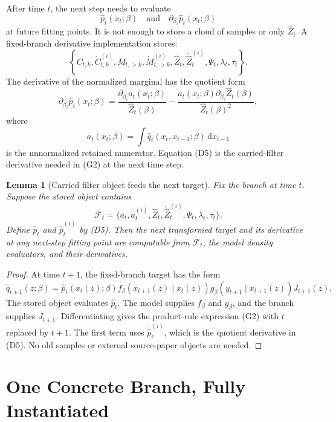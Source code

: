 \documentclass[11pt]{article}
\newtheorem{lemma}{Lemma}
\newcommand{\dd}{\,\mathrm d}
\begin{document}
After time \(t\), the next step needs to evaluate
\[
    \widehat p_t(x_t;\beta)
    \quad\text{and}\quad
    \partial_{\beta_i}\widehat p_t(x_t;\beta)
\]
at future fitting points.  It is not enough to store a cloud of samples or only
\(\widehat Z_t\).  A fixed-branch derivative implementation stores:
\[
    \left\{
    C_{t,k},\dot C_{t,k}^{(i)},M_{t,>k},\dot M_{t,>k}^{(i)},
    \widehat Z_t,\dot{\widehat Z}_t^{(i)},
    \Psi_t,\lambda_t,\tau_t
    \right\}.
    \tag{D4}
\]
The derivative of the normalized marginal has the quotient form
\[
    \partial_{\beta_i}\widehat p_t(x_t;\beta)
    =
    \frac{\partial_{\beta_i}a_t(x_t;\beta)}{\widehat Z_t(\beta)}
    -
    \frac{a_t(x_t;\beta)\partial_{\beta_i}\widehat Z_t(\beta)}
    {\widehat Z_t(\beta)^2},
    \tag{D5}
\]
where
\[
    a_t(x_t;\beta)
    =
    \int \widehat q_t(x_t,x_{t-1};\beta)\dd x_{t-1}
    \tag{D6}
\]
is the unnormalized retained numerator.  Equation (D5) is the carried-filter
derivative needed in (G2) at the next time step.

\begin{lemma}[Carried filter object feeds the next target]
Fix the branch at time \(t\).  Suppose the stored object contains
\[
    \mathcal F_t
    =
    \{a_t,\dot a_t^{(i)},\widehat Z_t,\dot{\widehat Z}_t^{(i)},
      \Psi_t,\lambda_t,\tau_t\}.
\]
Define \(\widehat p_t\) and \(\dot{\widehat p}_t^{(i)}\) by (D5).  Then the
next transformed target and its derivative at any next-step fitting point are
computable from \(\mathcal F_t\), the model density evaluators, and their
derivatives.
\end{lemma}

\begin{proof}
At time \(t+1\), the fixed-branch target has the form
\[
    \widetilde q_{t+1}(z;\beta)
    =
    \widehat p_t(x_t(z);\beta)
    f_\beta(x_{t+1}(z)\mid x_t(z))
    g_\beta(y_{t+1}\mid x_{t+1}(z))
    J_{t+1}(z).
\]
The stored object evaluates \(\widehat p_t\).  The model supplies \(f_\beta\)
and \(g_\beta\), and the branch supplies \(J_{t+1}\).  Differentiating gives
the product-rule expression (G2) with \(t\) replaced by \(t+1\).  The first
term uses \(\dot{\widehat p}_t^{(i)}\), which is the quotient derivative in
(D5).  No old samples or external source-paper objects are needed.
\end{proof}

\section{One Concrete Branch, Fully Instantiated}
\end{document}
